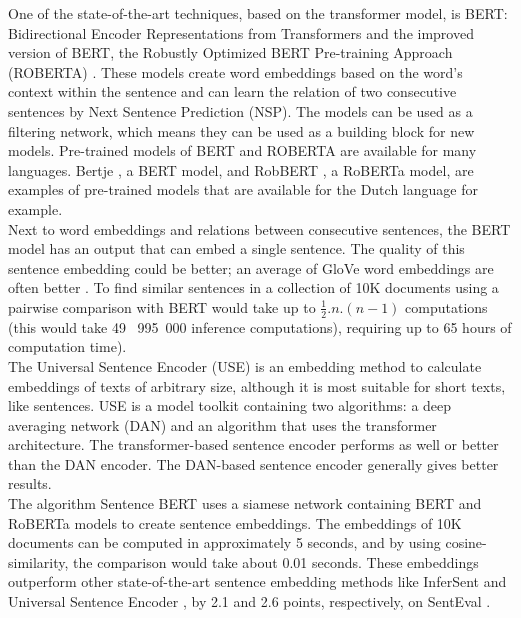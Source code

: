 One of the state-of-the-art techniques, based on the transformer model, is BERT: Bidirectional Encoder Representations from Transformers \citep{devlin2018bert} and the improved version of BERT, the Robustly Optimized BERT Pre-training Approach (ROBERTA) \citep{Liu2019RoBERTaAR}. These models create word embeddings based on the word's context within the sentence and can learn the relation of two consecutive sentences by Next Sentence Prediction (NSP). The models can be used as a filtering network, which means they can be used as a building block for new models. Pre-trained models of BERT and ROBERTA are available for many languages. Bertje \citep{devries2019bertje}, a BERT model, and RobBERT \citep{delobelle2020robbert}, a RoBERTa model, are examples of pre-trained models that are available for the Dutch language for example.\\


Next to word embeddings and relations between consecutive sentences, the BERT model has an output that can embed a single sentence. The quality of this sentence embedding could be better; an average of GloVe \citep{glove} word embeddings are often better \citep{reimers2019sentence}. To find similar sentences in a collection of 10K documents using a pairwise comparison with BERT would take up to $\frac{1}{2}.n.(n-1)$ computations (this would take 49~ 995~000 inference computations), requiring up to 65 hours of computation time). \\

The Universal Sentence Encoder (USE) is an embedding method \citep{cer2018universal} to calculate embeddings of texts of arbitrary size, although it is most suitable for short texts, like sentences.  USE is a model toolkit containing two algorithms: a deep averaging network (\textsc{DAN}) \citep{DAN} and an algorithm that uses the transformer architecture. The transformer-based sentence encoder performs as well or better than the DAN encoder. The DAN-based sentence encoder generally gives better results.\\

 The algorithm Sentence BERT \citep{reimers2019sentence} uses a siamese network \citep{jiang2019semantic} containing BERT and RoBERTa models to create sentence embeddings. The embeddings of 10K documents can be computed in approximately 5 seconds, and by using cosine-similarity, the comparison would take about 0.01 seconds. These embeddings outperform other state-of-the-art sentence embedding methods like InferSent \citep{conneau2017supervised} and Universal Sentence Encoder \citep{cer2018universal}, by 2.1 and 2.6 points, respectively, on SentEval \citep{conneau2018senteval}.
 
